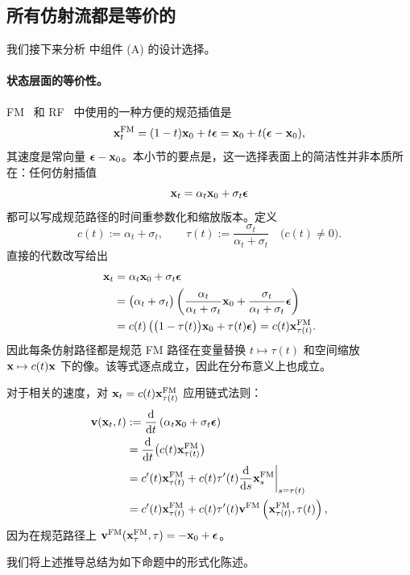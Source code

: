 \subsection{所有仿射流都是等价的}\label{subsec:all-flows-are-equiv}
我们接下来分析  中组件 (A) 的设计选择。

\paragraph{状态层面的等价性。}
FM~\citep{lipman2022flow} 和 RF~\citep{liu2022rectified} 中使用的一种方便的规范插值是
\[
{\mathbf{x}}_t^{\mathrm{FM}}=(1-t) {\mathbf{x}}_0+t {\bm{\epsilon}} = {\mathbf{x}}_{0}+t({\bm{\epsilon}}-{\mathbf{x}}_0),
\]
其速度是常向量 ${\bm{\epsilon}}-{\mathbf{x}}_0$。本小节的要点是，这一选择表面上的简洁性并非本质所在：任何仿射插值
\[
{\mathbf{x}}_t=\alpha_t {\mathbf{x}}_0+\sigma_t {\bm{\epsilon}}
\]
都可以写成规范路径的时间重参数化和缩放版本。定义
\[
c(t):=\alpha_t+\sigma_t,
\qquad
\tau(t):=\frac{\sigma_t}{\alpha_t+\sigma_t}
\quad\big(c(t)\neq 0\big).
\]
直接的代数改写给出
\begin{align*}
{\mathbf{x}}_t
&=\alpha_t {\mathbf{x}}_0+\sigma_t {\bm{\epsilon}}
\\
&=\big(\alpha_t+\sigma_t\big) \left(\frac{\alpha_t}{\alpha_t+\sigma_t}{\mathbf{x}}_0+\frac{\sigma_t}{\alpha_t+\sigma_t}{\bm{\epsilon}}\right) \\
&=c(t) \left(\big(1-\tau(t)\big){\mathbf{x}}_0+\tau(t){\bm{\epsilon}}\right)
=c(t) {\mathbf{x}}_{\tau(t)}^{\mathrm{FM}}.
\end{align*}
因此每条仿射路径都是规范 FM 路径在变量替换 $t\mapsto\tau(t)$ 和空间缩放 ${\mathbf{x}}\mapsto c(t){\mathbf{x}}$ 下的像。该等式逐点成立，因此在分布意义上也成立。

对于相关的速度，对 ${\mathbf{x}}_t=c(t){\mathbf{x}}_{\tau(t)}^{\mathrm{FM}}$ 应用链式法则：
\begin{align*}
{\mathbf{v}}({\mathbf{x}}_t,t)
&:= \frac{\mathop{}\!\mathrm{d}}{\mathop{}\!\mathrm{d} t}\left(\alpha_t{\mathbf{x}}_0 +\sigma_t {\bm{\epsilon}}\right)
\\&=\frac{\mathop{}\!\mathrm{d}}{\mathop{}\!\mathrm{d} t}\big(c(t){\mathbf{x}}_{\tau(t)}^{\mathrm{FM}}\big)
\\
&=c'(t) {\mathbf{x}}_{\tau(t)}^{\mathrm{FM}}+c(t) \tau'(t) \frac{\mathop{}\!\mathrm{d}}{\mathop{}\!\mathrm{d} s}{\mathbf{x}}^{\mathrm{FM}}_{s}\bigg|_{s=\tau(t)} \\
&=c'(t) {\mathbf{x}}_{\tau(t)}^{\mathrm{FM}}+c(t) \tau'(t) {\mathbf{v}}^{\mathrm{FM}} \left({\mathbf{x}}_{\tau(t)}^{\mathrm{FM}},\tau(t)\right),
\end{align*}
因为在规范路径上 ${\mathbf{v}}^{\mathrm{FM}}({\mathbf{x}}^{\mathrm{FM}}_{\tau},\tau)=-{\mathbf{x}}_0+{\bm{\epsilon}}$。

我们将上述推导总结为如下命题中的形式化陈述。


